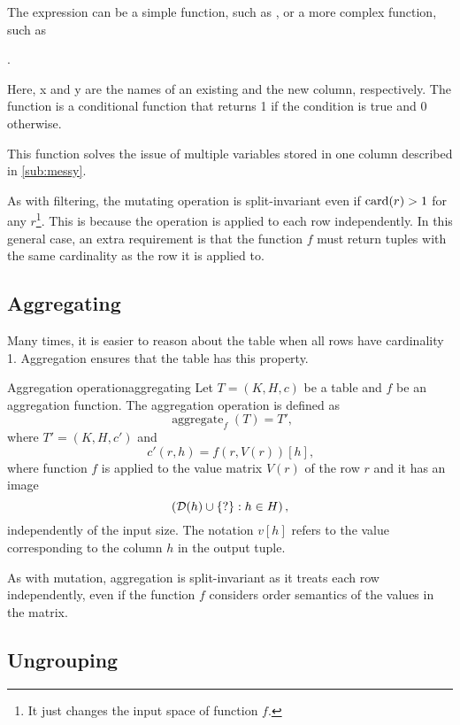 The expression can be a simple function, such as , or a more complex
function, such as
\begin{center}
  .
\end{center}
Here, x and y are the names of an existing and the new column, respectively. The
 function is a conditional function that returns 1 if the condition
is true and 0 otherwise.

This function solves the issue of multiple variables stored in one column described in
\cref{sub:messy}.

As with filtering, the mutating operation is split-invariant even if $\rowcard[r] > 1$ for
any $r$\footnote{It just changes the input space of function $f$.}.  This is because the
operation is applied to each row independently.  In this general case, an extra
requirement is that the function $f$ must return tuples with the same cardinality as
the row it is applied to.

\subsection{Aggregating}
\label{sub:aggregation}

Many times, it is easier to reason about the table when all rows have cardinality 1.
Aggregation ensures that the table has this property.

\begin{defbox}{Aggregation operation}{aggregating}
  Let $T = (K, H, c)$ be a table and $f$ be an aggregation function.  The aggregation
  operation is defined as \[
    \operatorname{aggregate}_{f}(T) = T'\text{,}
  \] where $T' = (K, H, c')$ and \[
    c'(r, h) = f(r, V(r))[h]\text{,}
  \] where function $f$ is applied to the value matrix $V(r)$ of the row $r$ and it has
  an image $$\left(\domainof{h} \cup \{?\} : h \in H\right)\text{,}$$ independently of the
  input size.  The notation $v[h]$ refers to the value corresponding to the column $h$ in the
  output tuple.
\end{defbox}

As with mutation, aggregation is split-invariant as it treats each row independently,
even if the function $f$ considers order semantics of the values in the matrix.

\subsection{Ungrouping}
\label{sub:ungrouping}

